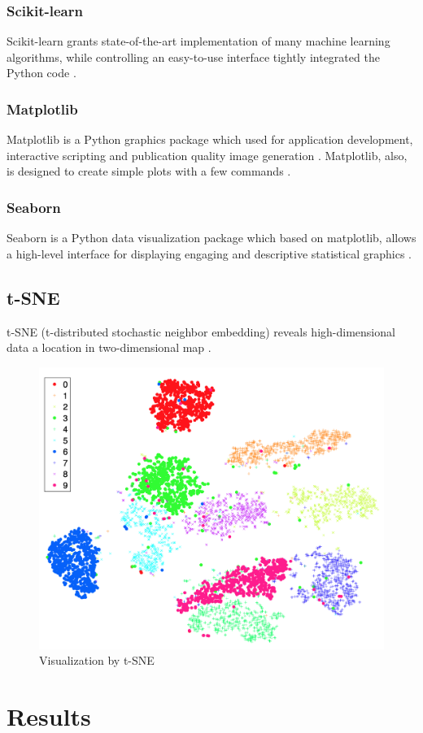 \documentclass[a4paper]{article}
\begin{document}
            \subsubsection{Scikit-learn}
                Scikit-learn grants state-of-the-art implementation of many machine learning algorithms, while controlling an easy-to-use interface tightly integrated the Python code \cite{sklearn1}.

            \subsubsection{Matplotlib}
                Matplotlib is a Python graphics package which used for application development, interactive scripting and publication quality image generation \cite{matplotlib2}. Matplotlib, also, is designed to create simple plots with a few commands \cite{matplotlib1}.

            \subsubsection{Seaborn}
                Seaborn is a Python data visualization package which based on matplotlib, allows a high-level interface for displaying engaging and descriptive statistical graphics \cite{seaborn1}.

        \subsection{t-SNE}
            t-SNE (t-distributed stochastic neighbor embedding) reveals high-dimensional data a location in two-dimensional map \cite{tSNE1}.

            \begin{figure}[p]
                \centering
                \includegraphics[width=0.4 \linewidth]{figures/tSNE.png}
                \caption{Visualization by t-SNE \protect\cite{tSNE1}}
            \end{figure}

    \section{Results}
\end{document}
